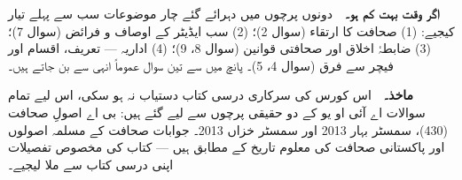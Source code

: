 \vfill
\begin{center}
\begin{tcolorbox}[enhanced, colback=white, colframe=bmblue, boxrule=0.5pt,
                  arc=3pt, width=0.94\linewidth,
                  left=11pt, right=11pt, top=9pt, bottom=9pt]
\small
\textbf{\color{bmblue}اگر وقت بہت کم ہو۔}\ \
دونوں پرچوں میں دہرائے گئے چار موضوعات سب سے پہلے تیار کیجیے:
\textenglish{(1)} صحافت کا ارتقاء (سوال \textenglish{2})؛
\textenglish{(2)} سب ایڈیٹر کے اوصاف و فرائض (سوال \textenglish{7})؛
\textenglish{(3)} ضابطۂ اخلاق اور صحافتی قوانین (سوال \textenglish{8}،
\textenglish{9})؛
\textenglish{(4)} اداریہ --- تعریف، اقسام اور فیچر سے فرق (سوال
\textenglish{4}، \textenglish{5})۔
پانچ میں سے تین سوال عموماً انہی سے بن جاتے ہیں۔

\medskip
\textbf{\color{bmblue}ماخذ۔}\ \
اس کورس کی سرکاری درسی کتاب دستیاب نہ ہو سکی، اس لیے تمام سوالات اے آئی او یو
کے دو حقیقی پرچوں سے لیے گئے ہیں: بی اے اصولِ صحافت (\textenglish{430})،
سمسٹر بہار \textenglish{2013} اور سمسٹر خزاں \textenglish{2013}۔ جوابات صحافت
کے مسلمہ اصولوں اور پاکستانی صحافت کی معلوم تاریخ کے مطابق ہیں --- کتاب کی
مخصوص تفصیلات اپنی درسی کتاب سے ملا لیجیے۔
\end{tcolorbox}
\end{center}
